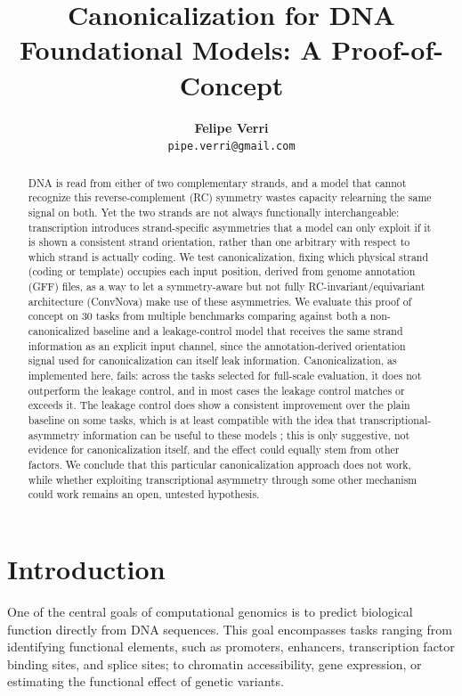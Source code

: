 \documentclass[   ]{article}
\title{Canonicalization for DNA Foundational Models: A Proof-of-Concept}
\author{
	\textbf{Felipe Verri} \\
	\texttt{pipe.verri@gmail.com}\\
}
\begin{document}
	
\maketitle

\begin{abstract}
	DNA is read from either of two complementary strands, and a model that cannot recognize this reverse-complement (RC) symmetry wastes capacity relearning the same signal on both. Yet the two strands are not always functionally interchangeable: transcription introduces strand-specific asymmetries that a model can only exploit if it is shown a consistent strand orientation, rather than one arbitrary with respect to which strand is actually coding. We test canonicalization, fixing which physical strand (coding or template) occupies each input position, derived from genome annotation (GFF) files, as a way to let a symmetry-aware but not fully RC-invariant/equivariant architecture (ConvNova) make use of these asymmetries. We evaluate this proof of concept on 30 tasks from multiple benchmarks comparing against both a non-canonicalized baseline and a leakage-control model that receives the same strand information as an explicit input channel, since the annotation-derived orientation signal used for canonicalization can itself leak information. Canonicalization, as implemented here, fails: across the tasks selected for full-scale evaluation, it does not outperform the leakage control, and in most cases the leakage control matches or exceeds it. The leakage control does show a consistent improvement over the plain baseline on some tasks, which is at least compatible with the idea that transcriptional-asymmetry information can be useful to these models ; this is only suggestive, not evidence for canonicalization itself, and the effect could equally stem from other factors. We conclude that this particular canonicalization approach does not work, while whether exploiting transcriptional asymmetry through some other mechanism could work remains an open, untested hypothesis.
\end{abstract}

\section{Introduction}\label{introduction}

One of the central goals of computational genomics is to predict
biological function directly from DNA sequences. This goal encompasses
tasks ranging from identifying functional elements, such as
promoters, enhancers, transcription factor binding sites, and splice
sites; to chromatin accessibility, gene expression, or estimating the
functional effect of genetic variants.
\end{document}
